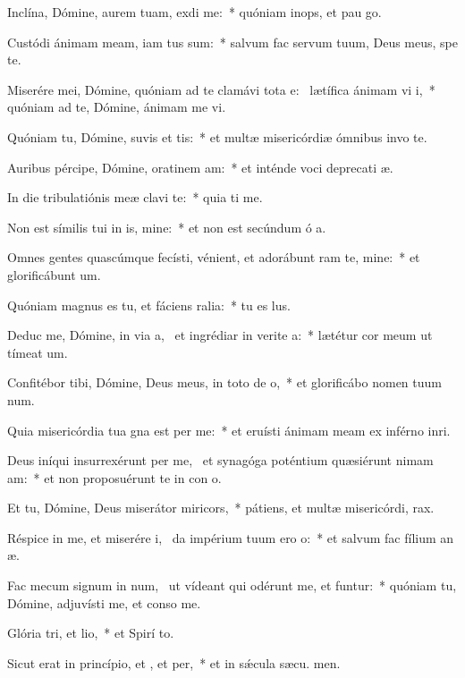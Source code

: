 \item Inclína, Dómine, aurem tuam,  exdi me:~* quóniam inops, et pau  go.
\item Custódi ánimam meam, iam tus sum:~* salvum fac servum tuum, Deus meus, spe  te.
\item Miserére mei, Dómine, quóniam ad te clamávi tota e:~\pscross{} lætífica ánimam vi i,~* quóniam ad te, Dómine, ánimam me vi.
\item Quóniam tu, Dómine, suvis et tis:~* et multæ misericórdiæ ómnibus invo te.
\item Auribus pércipe, Dómine, oratinem am:~* et inténde voci deprecati æ.
\item In die tribulatiónis meæ clavi  te:~* quia ti me.
\item Non est símilis tui in is, mine:~* et non est secúndum ó a.
\item Omnes gentes quascúmque fecísti, vénient, et adorábunt ram te, mine:~* et glorificábunt  um.
\item Quóniam magnus es tu, et fáciens ralia:~* tu es  lus.
\item Deduc me, Dómine, in via a,~\pscross{} et ingrédiar in verite a:~* lætétur cor meum ut tímeat  um.
\item Confitébor tibi, Dómine, Deus meus, in toto de o,~* et glorificábo nomen tuum  num.
\item Quia misericórdia tua gna est per me:~* et eruísti ánimam meam ex inférno inri.
\item Deus iníqui insurrexérunt per me,~\pscross{} et synagóga poténtium quæsiérunt nimam am:~* et non proposuérunt te in con o.
\item Et tu, Dómine, Deus miserátor  miricors,~* pátiens, et multæ misericórdi,  rax.
\item Réspice in me, et miserére i,~\pscross{} da impérium tuum ero o:~* et salvum fac fílium an æ.
\item Fac mecum signum in num,~\pscross{} ut vídeant qui odérunt me, et funtur:~* quóniam tu, Dómine, adjuvísti me, et conso  me.
\item Glória tri, et lio,~* et Spirí to.
\item Sicut erat in princípio, et , et per,~* et in sǽcula sæcu. men.
